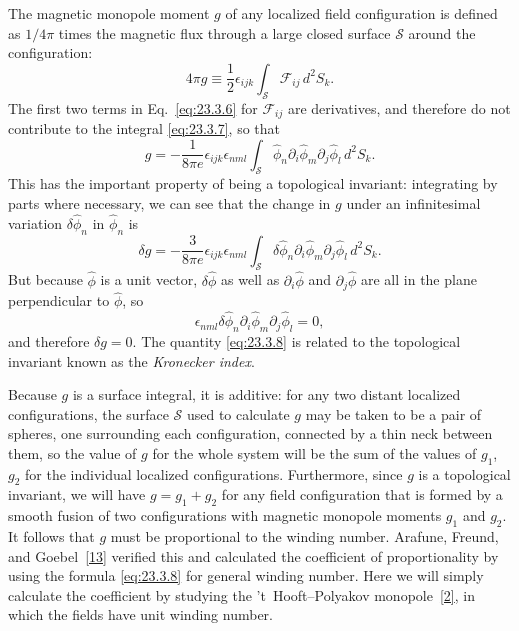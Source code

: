 The magnetic monopole moment $g$ of any localized field configuration is
defined as $1/4\pi$ times the magnetic flux through a large closed surface
$\mathcal S$ around the configuration:
\begin{equation}
 4\pi g\equiv\frac12\epsilon_{ijk}
 \int_{\mathcal S}\mathcal F_{ij}\,d^2S_k.
 \tag{23.3.7}\label{eq:23.3.7}
\end{equation}
The first two terms in Eq.~\eqref{eq:23.3.6} for $\mathcal F_{ij}$ are
derivatives, and therefore do not contribute to the integral
\eqref{eq:23.3.7}, so that
\begin{equation}
 g=-\frac1{8\pi e}\epsilon_{ijk}\epsilon_{nml}
 \int_{\mathcal S}\hat\phi_n\partial_i\hat\phi_m
 \partial_j\hat\phi_l\,d^2S_k.
 \tag{23.3.8}\label{eq:23.3.8}
\end{equation}
This has the important property of being a topological invariant:
integrating by parts where necessary, we can see that the change in $g$
under an infinitesimal variation $\delta\hat\phi_n$ in $\hat\phi_n$ is
\[
 \delta g=-\frac3{8\pi e}\epsilon_{ijk}\epsilon_{nml}
 \int_{\mathcal S}\delta\hat\phi_n\partial_i\hat\phi_m
 \partial_j\hat\phi_l\,d^2S_k.
\]
But because $\hat\phi$ is a unit vector, $\delta\hat\phi$ as well as
$\partial_i\hat\phi$ and $\partial_j\hat\phi$ are all in the plane
perpendicular to $\hat\phi$, so
\[
 \epsilon_{nml}\delta\hat\phi_n
 \partial_i\hat\phi_m\partial_j\hat\phi_l=0,
\]
and therefore $\delta g=0$. The quantity \eqref{eq:23.3.8} is related to
the topological invariant known as the \emph{Kronecker index}.

Because $g$ is a surface integral, it is additive: for any two distant
localized configurations, the surface $\mathcal S$ used to calculate $g$
may be taken to be a pair of spheres, one surrounding each configuration,
connected by a thin neck between them, so the value of $g$ for the whole
system will be the sum of the values of $g_1$, $g_2$ for the individual
localized configurations. Furthermore, since $g$ is a topological
invariant, we will have $g=g_1+g_2$ for any field configuration that is
formed by a smooth fusion of two configurations with magnetic monopole
moments $g_1$ and $g_2$. It follows that $g$ must be proportional to the
winding number. Arafune, Freund, and Goebel~\hyperref[ch23-ref-13]{[13]}
verified this and calculated the coefficient of proportionality by using
the formula \eqref{eq:23.3.8} for general winding number. Here we will
simply calculate the coefficient by studying the 't~Hooft--Polyakov
monopole~\hyperref[ch23-ref-2]{[2]}, in which the fields have unit winding
number.

